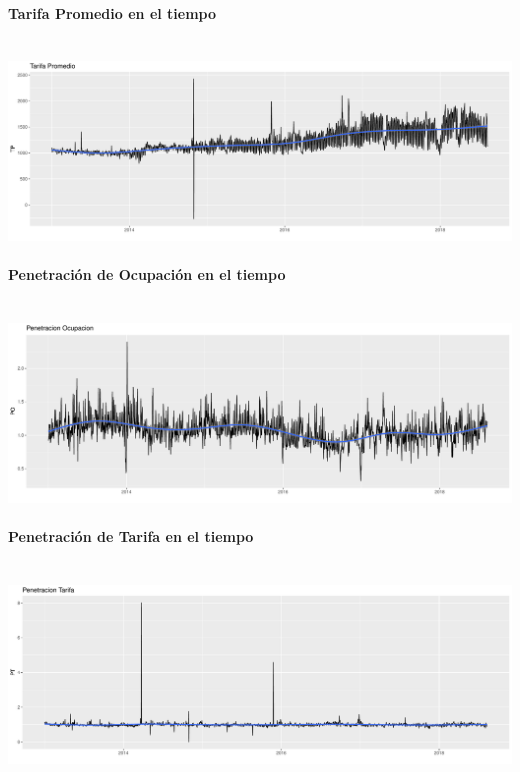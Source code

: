 \documentclass{article}\usepackage[]{graphicx}\usepackage[]{color}
\makeatletter
\def\maxwidth{ %
  \ifdim\Gin@nat@width>\linewidth
    \linewidth
  \else
    \Gin@nat@width
  \fi
}
\newenvironment{knitrout}{}{} %
\makeatother
\begin{document}
\paragraph{Tarifa Promedio en el tiempo} ~\\
\begin{knitrout}
\color{fgcolor}
\includegraphics[width=\maxwidth]{figures/IndicadoresTarifaPromedio-1} 

\end{knitrout}
\paragraph{Penetración de Ocupación en el tiempo} ~\\
\begin{knitrout}
\color{fgcolor}
\includegraphics[width=\maxwidth]{figures/IndicadoresPO-1} 

\end{knitrout}
\paragraph{Penetración de Tarifa en el tiempo} ~\\
\begin{knitrout}
\color{fgcolor}
\includegraphics[width=\maxwidth]{figures/IndicadoresPT-1} 

\end{knitrout}
\end{document}
